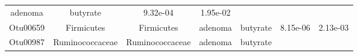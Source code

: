 \documentclass[11pt,]{article}
\begin{document}
\begin{longtable}[]{@{}ccccccc@{}}
\begin{minipage}[t]{0.09\columnwidth}
adenoma\strut
\end{minipage} & \begin{minipage}[t]{0.11\columnwidth}\centering\strut
butyrate\strut
\end{minipage} & \begin{minipage}[t]{0.09\columnwidth}\centering\strut
9.32e-04\strut
\end{minipage} & \begin{minipage}[t]{0.09\columnwidth}\centering\strut
1.95e-02\strut
\end{minipage}\tabularnewline
\begin{minipage}[t]{0.09\columnwidth}\centering\strut
Otu00659\strut
\end{minipage} & \begin{minipage}[t]{0.17\columnwidth}\centering\strut
Firmicutes\strut
\end{minipage} & \begin{minipage}[t]{0.17\columnwidth}\centering\strut
Firmicutes\strut
\end{minipage} & \begin{minipage}[t]{0.09\columnwidth}\centering\strut
adenoma\strut
\end{minipage} & \begin{minipage}[t]{0.11\columnwidth}\centering\strut
butyrate\strut
\end{minipage} & \begin{minipage}[t]{0.09\columnwidth}\centering\strut
8.15e-06\strut
\end{minipage} & \begin{minipage}[t]{0.09\columnwidth}\centering\strut
2.13e-03\strut
\end{minipage}\tabularnewline
\begin{minipage}[t]{0.09\columnwidth}\centering\strut
Otu00987\strut
\end{minipage} & \begin{minipage}[t]{0.17\columnwidth}\centering\strut
Ruminococcaceae\strut
\end{minipage} & \begin{minipage}[t]{0.17\columnwidth}\centering\strut
Ruminococcaceae\strut
\end{minipage} & \begin{minipage}[t]{0.09\columnwidth}\centering\strut
adenoma\strut
\end{minipage} & \begin{minipage}[t]{0.11\columnwidth}\centering\strut
butyrate\strut
\end{minipage} & \begin{minipage}[t]{0.09\columnwidth}\centering\strut

\end{minipage}
\end{longtable}
\end{document}
